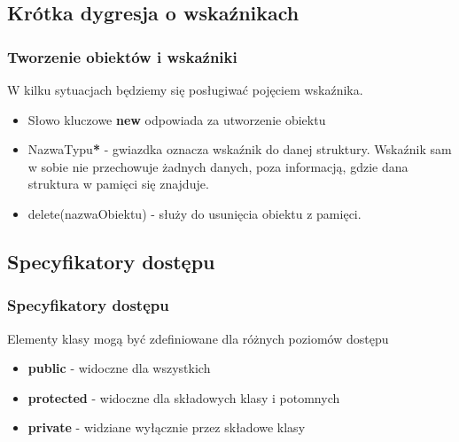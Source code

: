 \documentclass[slidestop,compress,mathserif]{beamer}
\begin{document}
\subsection{Krótka dygresja o wskaźnikach}
\begin{frame}
 \frametitle{Tworzenie obiektów i wskaźniki}
 W kilku sytuacjach będziemy się posługiwać pojęciem wskaźnika. 
 \begin{itemize}
 \pause
 \item Słowo kluczowe \textbf{new} odpowiada za utworzenie obiektu
 \pause
 \item NazwaTypu\textbf{*} - gwiazdka oznacza wskaźnik do danej struktury. Wskaźnik sam w sobie nie przechowuje żadnych danych, poza informacją, gdzie dana struktura w pamięci się znajduje.
 \pause
 \item delete(nazwaObiektu) - służy do usunięcia obiektu z pamięci.
\end{itemize}
\pause
\testcode
\end{frame}

\subsection{Specyfikatory dostępu}
\begin{frame}
 \frametitle{Specyfikatory dostępu}
 Elementy klasy mogą być zdefiniowane dla różnych poziomów dostępu
\begin{itemize}
 \pause
 \item \textbf{public} - widoczne dla wszystkich
 \pause
 \item \textbf{protected} - widoczne dla składowych klasy i potomnych
 \pause
 \item \textbf{private} - widziane wyłącznie przez składowe klasy
\end{itemize}
\end{frame}
\end{document}
